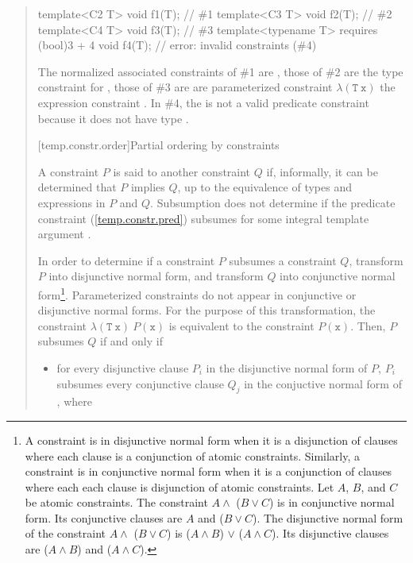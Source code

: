 \begin{quote}
\begin{codeblock}
template<C2 T> void f1(T);                            // \#1
template<C3 T> void f2(T);                            // \#2
template<C4 T> void f3(T);                            // \#3
template<typename T> requires (bool)3 + 4 void f4(T); // error: invalid constraints (\#4)
\end{codeblock}
The normalized associated constraints of \#1 are 
,
% 
those of \#2 are the type constraint for ,
%
those of \#3 are are parameterized constraint
$\lambda(\mathtt{T~x})$ the expression constraint .
% 
In \#4, the  
is not a valid predicate constraint because it does not have type .
\exitexample


[temp.constr.order]{Partial ordering by constraints}

\pnum
A constraint $P$ is said to  another constraint $Q$ 
if, informally, it can be determined that $P$ implies $Q$, up to 
the equivalence of types and expressions in $P$ and $Q$.
% 
\enterexample
Subsumption does not determine if the predicate constraint 
 (\ref{temp.constr.pred}) subsumes  for some 
integral template argument .
\exitexample

\pnum
In order to determine if a constraint $P$ subsumes a constraint
$Q$, transform $P$ into disjunctive normal form, 
and transform $Q$ into conjunctive normal form\footnote{
A constraint is in disjunctive normal form when it is a disjunction of
clauses where each clause is a conjunction of atomic constraints. 
% 
Similarly, a constraint is in conjunctive normal form when it is a conjunction 
of clauses where each each clause is disjunction of atomic constraints.
% 
\enterexample
Let $A$, $B$, and $C$ be atomic constraints.
% 
The constraint $A \land$ ($B \lor C$) is in 
conjunctive normal form.
% 
Its conjunctive clauses are $A$ and ($B \lor C$).
% 
The disjunctive normal form of the constraint
$A \land$ ($B \lor C$) 
is
($A \land B$) $\lor$ ($A \land C$).
% 
Its disjunctive clauses are ($A \land B$) and 
($A \land C$).
\exitexample
}.
% 
Parameterized constraints do not appear in conjunctive or disjunctive normal
forms. For the purpose of this transformation, the constraint
$\lambda(\mathtt{T~x})~P(\mathtt{x})$ is equivalent to the constraint 
$P(\mathtt{x})$.
% 
Then, $P$ subsumes $Q$ if and only if
\begin{itemize}
\item for every disjunctive clause $P_i$ in the disjunctive normal 
form of $P$, $P_i$ subsumes every conjunctive clause $Q_j$ 
in the conjuctive normal form of , where


\end{itemize}
\end{quote}
